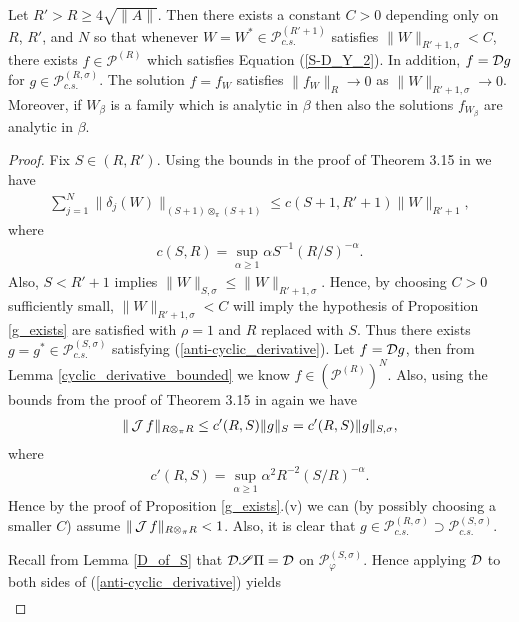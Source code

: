 \begin{thm}\label{existence_of_f}
Let $R'>R\geq 4\sqrt{\|A\|}$. Then there exists a constant $C>0$ depending only on $R$, $R'$, and $N$ so that whenever $W=W^*\in \mathscr{P}_{c.s.}^{(R'+1)}$ satisfies $\|W\|_{R'+1,\sigma}<C$, there exists $f\in\mathscr{P}^{(R)}$ which satisfies Equation (\ref{S-D_Y_2}). In addition, $f=\mathcal D g$ for $g\in\mathscr{P}^{(R,\sigma)}_{c.s.}$. The solution $f=f_W$ satisfies $\|f_W\|_R\rightarrow 0$ as $\|W\|_{R'+1,\sigma}\rightarrow 0$. Moreover, if $W_\beta$ is a family which is analytic in $\beta$ then also the solutions $f_{W_\beta}$ are analytic in $\beta$.
\end{thm}
\begin{proof}
Fix $S\in (R,R')$. Using the bounds in the proof of Theorem 3.15 in \cite{GS14} we have
	\begin{align*}
		\sum_{j=1}^N\|\delta_j(W)\|_{(S+1)\otimes_\pi (S+1)} \leq c(S+1,R'+1)\|W\|_{R'+1},
	\end{align*}
where
	\begin{align*}
		c(S,R)=\sup_{\alpha\geq 1} \alpha S^{-1}(R/S)^{-\alpha}.
	\end{align*}
Also, $S<R'+1$ implies $\|W\|_{S,\sigma}\leq \|W\|_{R'+1,\sigma}$. Hence, by choosing $C>0$ sufficiently small, $\|W\|_{R'+1,\sigma}<C$ will imply the hypothesis of Proposition \ref{g_exists} are satisfied with $\rho=1$ and $R$ replaced with $S$. Thus there exists $g=g^*\in \mathscr{P}_{c.s.}^{(S,\sigma)}$ satisfying (\ref{anti-cyclic_derivative}). Let $f=\mathcal D g$, then from Lemma \ref{cyclic_derivative_bounded} we know $f \in \left(\mathscr{P}^{(R)}\right)^N$. Also, using the bounds from the proof of Theorem 3.15 in \cite{GS14} again we have
	\begin{align*}
		\| \operatorname{\mathcal J} f\|_{R\otimes_\pi R} \leq c'(R,S)\|g\|_{S}=c'(R,S)\|g\|_{S,\sigma},
	\end{align*}
where
	\begin{align*}
		c'(R,S)=\sup_{\alpha\geq 1} \alpha^2 R^{-2}(S/R)^{-\alpha}.
	\end{align*}
Hence by the proof of Proposition \ref{g_exists}.(v) we can (by possibly choosing a smaller $C$) assume $\|\operatorname{\mathcal J} f\|_{R\otimes_\pi R}<1$. Also, it is clear that $g\in \mathscr{P}_{c.s.}^{(R,\sigma)}\supset \mathscr{P}_{c.s.}^{(S,\sigma)}$.\par
Recall from Lemma \ref{D_of_S} that $\mathcal D\mathscr{S}\Pi=\mathcal D$ on $\mathscr{P}_\varphi^{(S,\sigma)}$. Hence applying $\mathcal D$ to both sides of (\ref{anti-cyclic_derivative}) yields
	\begin{align*}

\end{align*}
\end{proof}
